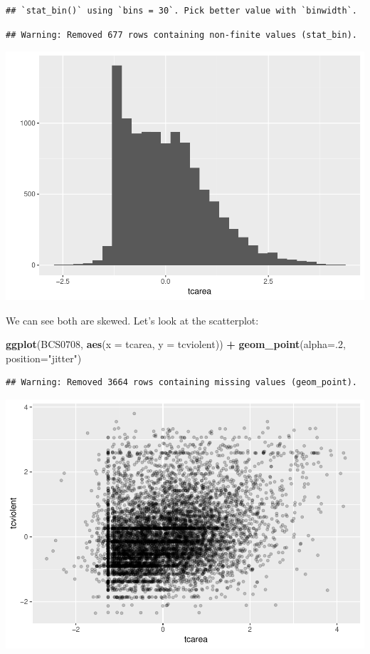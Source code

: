\documentclass[]{book}
\newenvironment{Shaded}{\begin{snugshade}}{\end{snugshade}}
\newcommand{\DataTypeTok}[1]{\textcolor[rgb]{0.13,0.29,0.53}{#1}}
\newcommand{\DecValTok}[1]{\textcolor[rgb]{0.00,0.00,0.81}{#1}}
\newcommand{\KeywordTok}[1]{\textcolor[rgb]{0.13,0.29,0.53}{\textbf{#1}}}
\newcommand{\NormalTok}[1]{#1}
\newcommand{\OperatorTok}[1]{\textcolor[rgb]{0.81,0.36,0.00}{\textbf{#1}}}
\newcommand{\StringTok}[1]{\textcolor[rgb]{0.31,0.60,0.02}{#1}}
\theoremstyle{definition}
\theoremstyle{definition}
\theoremstyle{definition}
\theoremstyle{remark}
\begin{document}
\begin{verbatim}
## `stat_bin()` using `bins = 30`. Pick better value with `binwidth`.
\end{verbatim}

\begin{verbatim}
## Warning: Removed 677 rows containing non-finite values (stat_bin).
\end{verbatim}

\includegraphics{08-regression_files/figure-latex/unnamed-chunk-2-2.pdf}

We can see both are skewed. Let's look at the scatterplot:

\begin{Shaded}
\begin{Highlighting}[]
\KeywordTok{ggplot}\NormalTok{(BCS0708, }\KeywordTok{aes}\NormalTok{(}\DataTypeTok{x =}\NormalTok{ tcarea, }\DataTypeTok{y =}\NormalTok{ tcviolent)) }\OperatorTok{+}
\StringTok{  }\KeywordTok{geom_point}\NormalTok{(}\DataTypeTok{alpha=}\NormalTok{.}\DecValTok{2}\NormalTok{, }\DataTypeTok{position=}\StringTok{"jitter"}\NormalTok{) }
\end{Highlighting}
\end{Shaded}

\begin{verbatim}
## Warning: Removed 3664 rows containing missing values (geom_point).
\end{verbatim}

\includegraphics{08-regression_files/figure-latex/unnamed-chunk-3-1.pdf}
\end{document}
